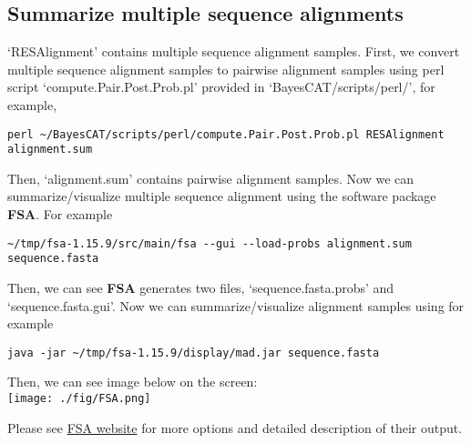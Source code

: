 \documentclass[11pt]{article}
\begin{document}
\subsection{Summarize multiple sequence alignments}
\label{sec-5-2}
`RESAlignment' contains multiple sequence alignment samples. First, we convert multiple sequence alignment samples to pairwise alignment samples using perl script `compute.Pair.Post.Prob.pl' provided in `BayesCAT/scripts/perl/', for example,
\begin{lstlisting}
perl ~/BayesCAT/scripts/perl/compute.Pair.Post.Prob.pl RESAlignment alignment.sum
\end{lstlisting}
Then, `alignment.sum' contains pairwise alignment samples. Now we can summarize/visualize multiple sequence alignment using the software package \textbf{FSA}. For example
\begin{lstlisting}
~/tmp/fsa-1.15.9/src/main/fsa --gui --load-probs alignment.sum sequence.fasta
\end{lstlisting}
Then, we can see \textbf{FSA} generates two files, `sequence.fasta.probs' and `sequence.fasta.gui'. 
Now we can summarize/visualize alignment samples using for example
\begin{lstlisting}
java -jar ~/tmp/fsa-1.15.9/display/mad.jar sequence.fasta
\end{lstlisting}
Then, we can see image below on the screen:\\
\texttt{[image: ./fig/FSA.png]}

Please see \href{http://fsa.sourceforge.net/}{FSA website} for more options and detailed description of their output.
\end{document}
